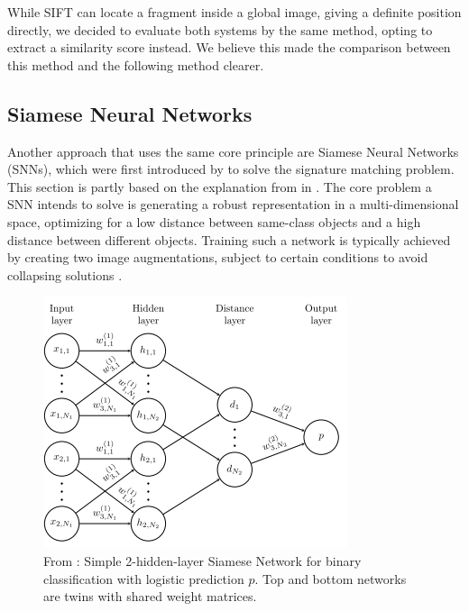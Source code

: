\documentclass[sigconf, natbib=false, nonacm]{acmart}
\begin{document}
        While SIFT can locate a fragment inside a global image, giving a definite position directly, we decided to evaluate both systems by the same method, opting to extract a similarity score instead. We believe this made the comparison between this method and the following method clearer. 
        
    \subsection{Siamese Neural Networks}\label{sec:snn}
        Another approach that uses the same core principle are Siamese Neural Networks (SNNs), which were first introduced by \citeauthor{Bromley1993} to solve the signature matching problem. This section is partly based on the explanation from \citeauthor{Koch2015} in \cite{Koch2015}. The core problem a SNN intends to solve is generating a robust representation in a multi-dimensional space, optimizing for a low distance between same-class objects and a high distance between different objects. Training such a network is typically achieved by creating two image augmentations, subject to certain conditions to avoid collapsing solutions \cite{Chen2020a}. 
        
        \begin{figure}
            \includegraphics[width=\linewidth]{figures/1-rl-snn.png}
            \caption{From \citeauthor{Koch2015} \cite{Koch2015}: Simple 2-hidden-layer Siamese Network for binary classification with logistic prediction $p$. Top and bottom networks are twins with shared weight matrices.}
            \label{fig:1-rl-snn}
        \end{figure}
        
\end{document}
